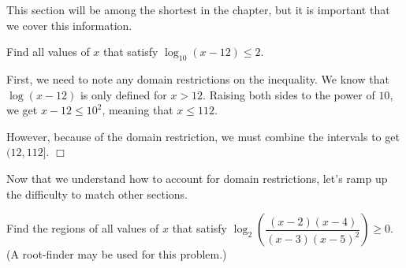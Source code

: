 \documentclass[lang=en,11pt]{elegantbook}
\begin{document}
This section will be among the shortest in the chapter, but it is important that we cover this information.
\begin{example}
Find all values of $x$ that satisfy $\log_{10}(x-12)\leq 2$.
\end{example}
\begin{solution}
First, we need to note any domain restrictions on the inequality.  We know that $\log(x-12)$ is only defined for $x>12$.  Raising both sides to the power of $10$, we get $x-12\leq 10^2$, meaning that $x\leq 112.$

However, because of the domain restriction, we must combine the intervals to get $(12,112]$. $\Box$
\end{solution}
Now that we understand how to account for domain restrictions, let's ramp up the difficulty to match other sections.
\begin{example}
Find the regions of all values of $x$ that satisfy $\log_2\left(\dfrac{(x-2)(x-4)}{(x-3)(x-5)^2}\right)\geq 0$. (A root-finder may be used for this problem.)
\end{example}
\end{document}
